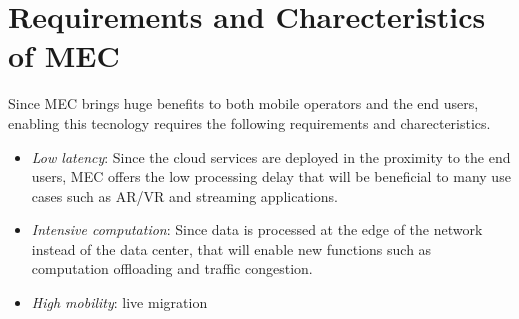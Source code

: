 \section{Requirements and Charecteristics of MEC}  \label{requirements}

Since MEC brings huge benefits to both mobile operators and the end users, enabling this tecnology requires the following requirements and charecteristics.

\begin{itemize}

\item \textit{\textit{Low latency}}: Since the cloud services are deployed in the proximity to the end users, MEC offers the low processing delay that will be beneficial to many use cases such as AR/VR and streaming applications.

\item \textit{\textit{Intensive computation}}: Since data is processed at the edge of the network instead of the data center, that will enable new functions such as computation offloading and traffic congestion.

\item \textit{\textit{High mobility}}: live migration

\end{itemize}
